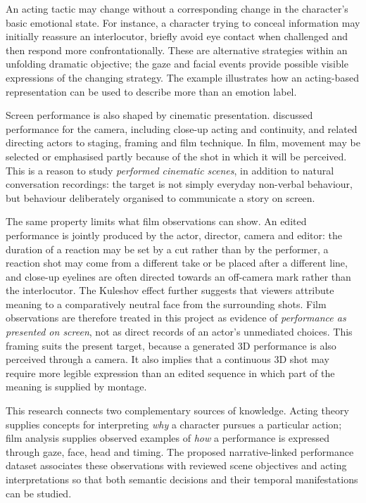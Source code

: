 \documentclass[11pt,a4paper]{article}
\begin{document}
An acting tactic may change without a corresponding change in the character's basic emotional state. For instance, a character trying to conceal information may initially reassure an interlocutor, briefly avoid eye contact when challenged and then respond more confrontationally. These are alternative strategies within an unfolding dramatic objective; the gaze and facial events provide possible visible expressions of the changing strategy. The example illustrates how an acting-based representation can be used to describe more than an emotion label.

Screen performance is also shaped by cinematic presentation. \citet{caine1990acting} discussed performance for the camera, including close-up acting and continuity, and \citet{rabiger2020directing} related directing actors to staging, framing and film technique. In film, movement may be selected or emphasised partly because of the shot in which it will be perceived. This is a reason to study \emph{performed cinematic scenes}, in addition to natural conversation recordings: the target is not simply everyday non-verbal behaviour, but behaviour deliberately organised to communicate a story on screen.

The same property limits what film observations can show. An edited performance is jointly produced by the actor, director, camera and editor: the duration of a reaction may be set by a cut rather than by the performer, a reaction shot may come from a different take or be placed after a different line, and close-up eyelines are often directed towards an off-camera mark rather than the interlocutor. The Kuleshov effect further suggests that viewers attribute meaning to a comparatively neutral face from the surrounding shots. Film observations are therefore treated in this project as evidence of \emph{performance as presented on screen}, not as direct records of an actor's unmediated choices. This framing suits the present target, because a generated 3D performance is also perceived through a camera. It also implies that a continuous 3D shot may require more legible expression than an edited sequence in which part of the meaning is supplied by montage.

This research connects two complementary sources of knowledge. Acting theory supplies concepts for interpreting \emph{why} a character pursues a particular action; film analysis supplies observed examples of \emph{how} a performance is expressed through gaze, face, head and timing. The proposed narrative-linked performance dataset associates these observations with reviewed scene objectives and acting interpretations so that both semantic decisions and their temporal manifestations can be studied.
\end{document}
